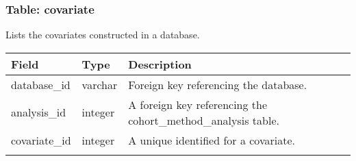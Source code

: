 \documentclass[
]{article}
\begin{document}
\hypertarget{table-covariate}{%
\subsubsection{Table: covariate}\label{table-covariate}}

Lists the covariates constructed in a database.

\begin{longtable}[]{@{}lll@{}}
\toprule
\begin{minipage}[b]{0.23\columnwidth}\raggedright
Field\strut
\end{minipage} & \begin{minipage}[b]{0.18\columnwidth}\raggedright
Type\strut
\end{minipage} & \begin{minipage}[b]{0.50\columnwidth}\raggedright
Description\strut
\end{minipage}\tabularnewline
\midrule
\endhead
\begin{minipage}[t]{0.23\columnwidth}\raggedright
database\_id\strut
\end{minipage} & \begin{minipage}[t]{0.18\columnwidth}\raggedright
varchar\strut
\end{minipage} & \begin{minipage}[t]{0.50\columnwidth}\raggedright
Foreign key referencing the database.\strut
\end{minipage}\tabularnewline
\begin{minipage}[t]{0.23\columnwidth}\raggedright
analysis\_id\strut
\end{minipage} & \begin{minipage}[t]{0.18\columnwidth}\raggedright
integer\strut
\end{minipage} & \begin{minipage}[t]{0.50\columnwidth}\raggedright
A foreign key referencing the cohort\_method\_analysis table.\strut
\end{minipage}\tabularnewline
\begin{minipage}[t]{0.23\columnwidth}\raggedright
covariate\_id\strut
\end{minipage} & \begin{minipage}[t]{0.18\columnwidth}\raggedright
integer\strut
\end{minipage} & \begin{minipage}[t]{0.50\columnwidth}\raggedright
A unique identified for a covariate.\strut
\end{minipage}\tabularnewline
\begin{minipage}[t]{0.23\columnwidth}\raggedright

\end{minipage}
\end{longtable}
\end{document}

